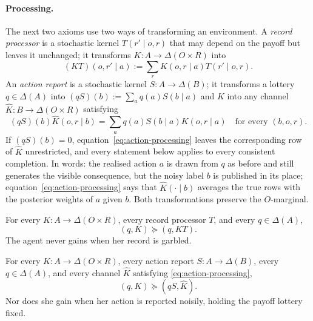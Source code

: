 \documentclass[11pt,a4paper]{article}
\theoremstyle{definition}
\newcommand{\D}{\Delta}
\newcommand{\1}{\mathbf 1}
\begin{document}
\paragraph{Processing.}
The next two axioms use two ways of transforming an environment.  A
\emph{record processor} is a stochastic kernel $T(r'\mid o,r)$ that may depend on the payoff but leaves it
unchanged; it transforms $K:A\to\D(O\times R)$ into
\begin{equation}
 (KT)(o,r'\mid a):=\sum_r K(o,r\mid a)T(r'\mid o,r).
 \label{eq:record-processing}
\end{equation}
An \emph{action report} is a stochastic kernel $S:A\to\D(B)$; it transforms a lottery $q\in\D(A)$ into
$(qS)(b):=\sum_aq(a)S(b\mid a)$ and $K$ into any channel $\widehat K:B\to\D(O\times R)$ satisfying
\begin{equation}
 (qS)(b)\widehat K(o,r\mid b)
 =\sum_a q(a)S(b\mid a)K(o,r\mid a)
 \quad\text{for every }(b,o,r).
 \label{eq:action-processing}
\end{equation}
If $(qS)(b)=0$, equation~\eqref{eq:action-processing} leaves the corresponding row of $\widehat K$ unrestricted,
and every statement below applies to every consistent completion.  In words: the realised action $a$ is drawn
from $q$ as before and still generates the visible consequence, but the noisy label $b$ is published in its
place; equation~\eqref{eq:action-processing} says that $\widehat K(\cdot\mid b)$ averages the true rows with the
posterior weights of $a$ given $b$.  Both transformations preserve the $O$-marginal.

\begin{description}[leftmargin=*,style=sameline]

\item[(A4) Record data processing.]
\label{ax:record-processing}
For every $K:A\to\D(O\times R)$, every record processor $T$, and every $q\in\D(A)$,
\[
 (q,K)\succeq(q,KT).
\]
The agent never gains when her record is garbled.

\item[(A5) Action data processing.]
\label{ax:action-processing}
For every $K:A\to\D(O\times R)$, every action report $S:A\to\D(B)$, every $q\in\D(A)$, and every channel
$\widehat K$ satisfying \eqref{eq:action-processing},
\[
 (q,K)\succeq(qS,\widehat K).
\]
Nor does she gain when her action is reported noisily, holding the payoff lottery fixed.

\end{description}
\end{document}
